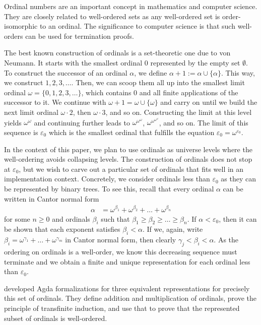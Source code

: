\documentclass[manuscript,screen,review,anonymous]{acmart}
\begin{document}
Ordinal numbers are an important concept in mathematics and computer
science. They are closely related to well-ordered sets as any
well-ordered set is order-isomorphic to an ordinal. The significance
to computer science is that such well-orders can be used for
termination proofs.

The best known construction of ordinals is a set-theoretic one due to
von Neumann. It starts with the smallest ordinal $0$ represented by
the empty set $\emptyset$. To construct the successor of an ordinal
$\alpha$, we define $\alpha+1  := \alpha \cup \{ \alpha \}$. This way,
we construct $1, 2, 3, \dots$. Then, we can scoop them all up into the
smallest limit ordinal $\omega = \{ 0, 1, 2, 3, \dots \}$, which
contains $0$ and all finite applications of the successor to it. We
continue with $\omega + 1 = \omega \cup \{ \omega \}$ and carry on
until we build the next limit ordinal $\omega \cdot 2$, then $\omega
\cdot 3$, and so on. Constructing the limit at this level yields
$\omega^\omega$ and continuing further leads to
$\omega^{\omega^\omega}$, $\omega^{\omega^{\omega^\omega}}$, and so
on. The limit of this sequence is $\varepsilon_0$ which is the
smallest ordinal that fulfills the equation
$\varepsilon_0 = \omega^{\varepsilon_0}$.

In the context of this paper, we plan to use
ordinals as universe levels where the well-ordering avoids collapsing
levels. The construction of ordinals does not stop at $\varepsilon_0$,
but we wish to carve out a particular set of ordinals that fits
well in an implementation context. Concretely, we consider ordinals
less than $\varepsilon_0$ as they can be represented by binary trees.
To see this, recall that every ordinal $\alpha$ can be written in
Cantor normal form
\begin{align*}
  \alpha &= \omega^{\beta_1} + \omega^{\beta_2}  + \dots + \omega^{\beta_n}
\end{align*}
for some $n\ge0$ and ordinals $\beta_i$ such that
$\beta_1\ge\beta_2\ge \dots \ge \beta_n$. If $\alpha < \varepsilon_0$,
then it can be shown that each exponent satisfies $\beta_i < \alpha$.
If we, again, write $\beta_i = \omega^{\gamma_1} + \dots +
\omega^{\gamma_m}$ in Cantor normal form, then clearly $\gamma_j <
\beta_i < \alpha$. As the ordering on ordinals is a well-order, we
know this decreasing sequence must terminate and we obtain a finite 
and unique representation for each ordinal less than $\varepsilon_0$.

\citet{DBLP:conf/cpp/ForsbergXG20} developed Agda
formalizations for three equivalent representations for precisely this
set of ordinals. They define addition and multiplication of ordinals,
prove the principle of transfinite induction, and use that to prove
that the represented subset of ordinals is well-ordered.
\end{document}
